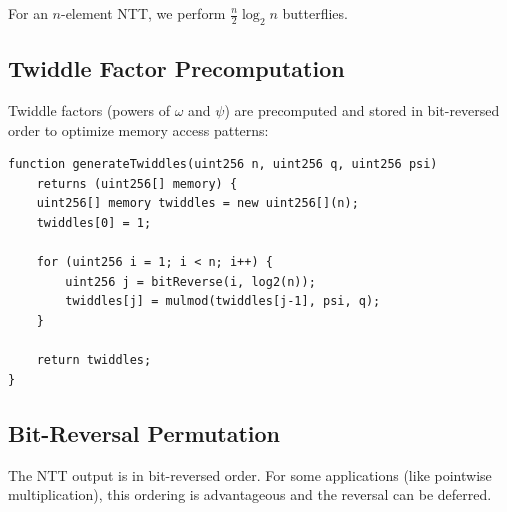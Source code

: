 For an $n$-element NTT, we perform $\frac{n}{2} \log_2 n$ butterflies.

\subsection{Twiddle Factor Precomputation}

Twiddle factors (powers of $\omega$ and $\psi$) are precomputed and stored in bit-reversed order to optimize memory access patterns:

\begin{lstlisting}[caption={Twiddle Factor Generation}]
function generateTwiddles(uint256 n, uint256 q, uint256 psi)
    returns (uint256[] memory) {
    uint256[] memory twiddles = new uint256[](n);
    twiddles[0] = 1;

    for (uint256 i = 1; i < n; i++) {
        uint256 j = bitReverse(i, log2(n));
        twiddles[j] = mulmod(twiddles[j-1], psi, q);
    }

    return twiddles;
}
\end{lstlisting}

\subsection{Bit-Reversal Permutation}

The NTT output is in bit-reversed order. For some applications (like pointwise multiplication), this ordering is advantageous and the reversal can be deferred.


